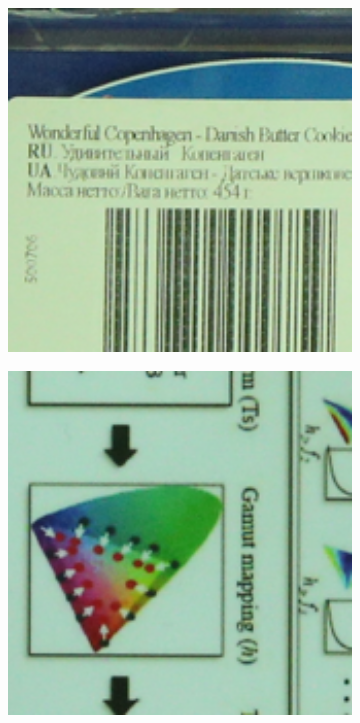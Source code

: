 \begin{figure}
    \centering
    \begin{subfigure}[t]{0.19\textwidth}
        \centering
        \includegraphics[width=1\textwidth]{images/guided/resize_CC_Noisy_Canon_EOS_5D_Mark3_ISO_3200_C1_52.png}
    \end{subfigure}
    \hfill
    \begin{subfigure}[t]{0.19\textwidth}
        \centering
        \includegraphics[width=1\textwidth]{images/guided/resize_CC_Noisy_Canon_EOS_5D_Mark3_ISO_3200_C2_44.png}

\end{subfigure}
\end{figure}
